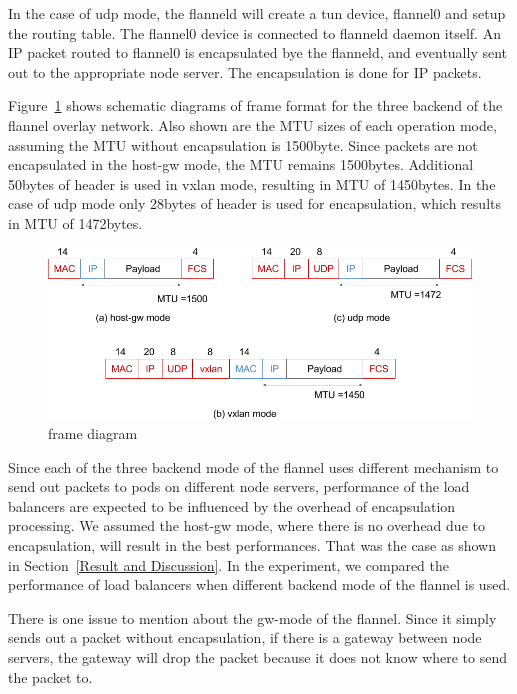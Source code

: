 In the case of udp mode, the flanneld will create a tun device, flannel0 and setup the routing table.
The flannel0 device is connected to flanneld daemon itself.
An IP packet routed to flannel0 is encapsulated bye the flanneld, and eventually sent out 
to the appropriate node server. 
The encapsulation is done for IP packets.

Figure~\ref{fig:flannel-packet-diagram} shows schematic diagrams of frame format for the three backend of 
the flannel overlay network.
Also shown are the MTU sizes of each operation mode, assuming the MTU without encapsulation is 1500byte.
Since packets are not encapsulated in the host-gw mode, the MTU remains 1500bytes.
Additional 50bytes of header is used in vxlan mode, resulting in MTU of 1450bytes.
In the case of udp mode only 28bytes of header is used for encapsulation, which results in MTU of 1472bytes.


\begin{figure}
\includegraphics[width=\columnwidth]{Figs/flannel-packet-diagram}
\caption{frame diagram}
\label{fig:flannel-packet-diagram}
\end{figure}

Since each of the three backend mode of the flannel uses different mechanism to send out packets to pods on different node servers, 
performance of the load balancers are expected to be influenced by the overhead of encapsulation processing.
We assumed the host-gw mode, where there is no overhead due to encapsulation, will result in the best performances.
That was the case as shown in Section~\ref{Result and Discussion}.
In the experiment, we compared the performance of load balancers when different backend mode of the flannel is used. 

There is one issue to mention about the gw-mode of the flannel.
Since it simply sends out a packet without encapsulation, 
if there is a gateway between node servers, 
the gateway will drop the packet because it does not know where to send the packet to.

